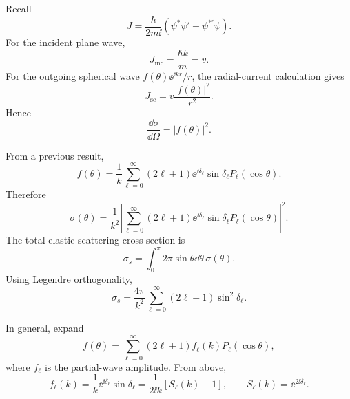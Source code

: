 Recall
\[
  J=\frac{\hbar}{2m\ii}(\psi^*\psi'-\psi^{*\prime}\psi).
\]
For the incident plane wave,
\[
  J_{\mathrm{inc}}=\frac{\hbar k}{m}=v.
\]
For the outgoing spherical wave $f(\theta)\ee^{\ii kr}/r$, the radial-current calculation gives
\begin{equation*}
  J_{\mathrm{sc}}=v\frac{|f(\theta)|^2}{r^2}.
  \tag{6}
\end{equation*}
Hence
\begin{equation*}
  \frac{\dd\sigma}{\dd\Omega}=|f(\theta)|^2.
  \tag{7}
\end{equation*}

From a previous result,
\begin{equation*}
  f(\theta)=\frac{1}{k}\sum_{\ell=0}^{\infty}(2\ell+1)
  \ee^{\ii\delta_\ell}\sin\delta_\ell
  P_\ell(\cos\theta).
  \tag{7a}
\end{equation*}
Therefore
\begin{equation*}
  \sigma(\theta)
  =\frac{1}{k^2}\left|
  \sum_{\ell=0}^{\infty}(2\ell+1)
  \ee^{\ii\delta_\ell}\sin\delta_\ell
  P_\ell(\cos\theta)
  \right|^2.
  \tag{8}
\end{equation*}
The total elastic scattering cross section is
\[
  \sigma_s=\int_0^\pi 2\pi\sin\theta\dd\theta\,\sigma(\theta).
\]
Using Legendre orthogonality,
\begin{equation*}
  \sigma_s=\frac{4\pi}{k^2}
  \sum_{\ell=0}^{\infty}(2\ell+1)\sin^2\delta_\ell.
  \tag{9}
\end{equation*}

In general, expand
\[
  f(\theta)=\sum_{\ell=0}^{\infty}(2\ell+1)f_\ell(k)P_\ell(\cos\theta),
\]
where $f_\ell$ is the partial-wave amplitude.  From above,
\begin{equation*}
  f_\ell(k)=\frac{1}{k}\ee^{\ii\delta_\ell}\sin\delta_\ell
  =\frac{1}{2\ii k}\left[S_\ell(k)-1\right],
  \qquad
  S_\ell(k)=\ee^{2\ii\delta_\ell}.
  \tag{10}
\end{equation*}


